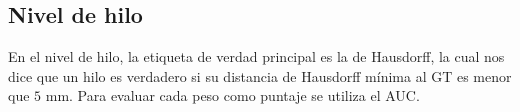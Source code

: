 \documentclass[11pt,a4paper]{article}
\begin{document}

\subsection{Nivel de hilo}
\label{sec:res-hilo}
En el nivel de hilo, la etiqueta de verdad principal es la de Hausdorff, la cual nos dice que  un hilo es verdadero si su distancia de Hausdorff mínima al GT es menor que $5$ mm. Para evaluar cada peso como puntaje se utiliza el AUC. 
\end{document}
